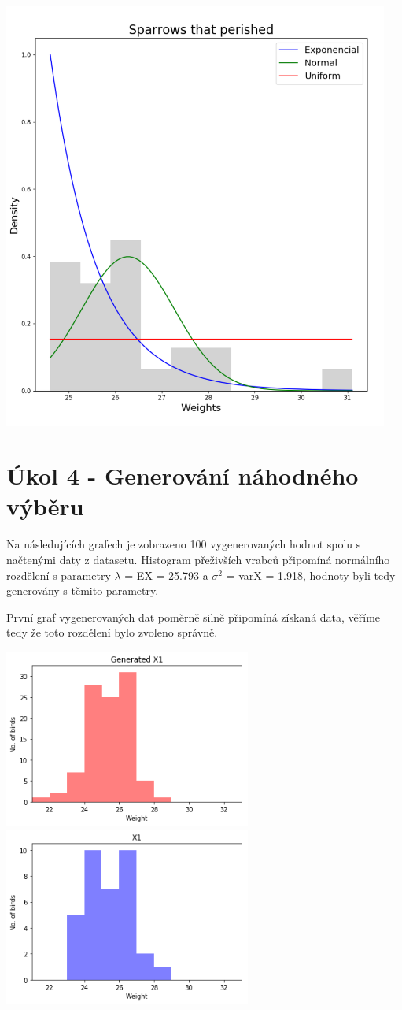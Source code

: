 \documentclass[12pt,a4paper]{article}
\begin{document}
\begin{center}
\includegraphics[width=5in]{3_died}
\end{center}
\section{Úkol 4 - Generování náhodného výběru}
Na následujících grafech je zobrazeno 100 vygenerovaných hodnot spolu s načtenými daty z datasetu. Histogram přeživších vrabců připomíná normálního rozdělení s parametry $\lambda$ = EX = 25.793 a $\sigma ^2$ = varX = 1.918, hodnoty byli tedy generovány s těmito parametry. 

První graf vygenerovaných dat poměrně silně připomíná získaná data, věříme tedy že toto rozdělení bylo zvoleno správně.

\includegraphics[width=3.2in]{4_Survived_Gen}
\includegraphics[width=3.2in]{4_Survived_Data}
\end{document}
